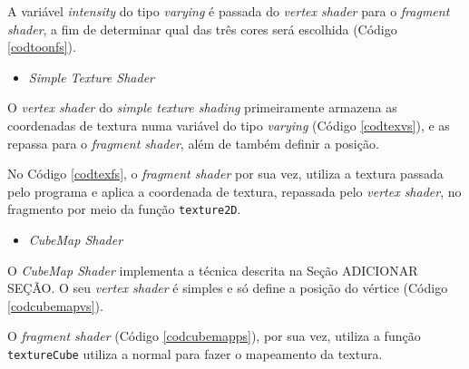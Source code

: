 	

	A variável \textit{intensity} do tipo \textit{varying} é passada do \textit{vertex shader} para o \textit{fragment shader}, a fim de determinar qual das três cores será escolhida (Código \ref{codtoonfs}). 
  
 	

	\begin{itemize}
  	\item \textit{Simple Texture Shader}
	\end{itemize}

	O \textit{vertex shader} do \textit{simple texture shading} primeiramente armazena as coordenadas de textura numa variável do tipo \textit{varying} (Código \ref{codtexvs}), e as repassa para o \textit{fragment shader}, além de também definir a posição.  

	

	No Código \ref{codtexfs}, o \textit{fragment shader} por sua vez, utiliza a textura passada pelo programa e aplica a coordenada de textura, repassada pelo \textit{vertex shader}, no fragmento por meio da função  \texttt{texture2D}.

	

	\begin{itemize}	
  	\item \textit{CubeMap Shader}
	\end{itemize}

	 O \textit{CubeMap Shader} implementa a técnica descrita na Seção ADICIONAR SEÇÃO. O seu  \textit{vertex shader} é simples e só define a posição do vértice (Código \ref{codcubemapvs}). 

	

	O  \textit{fragment shader} (Código \ref{codcubemapps}), por sua vez, utiliza a função \texttt{textureCube} utiliza a normal para fazer o mapeamento da textura. 

